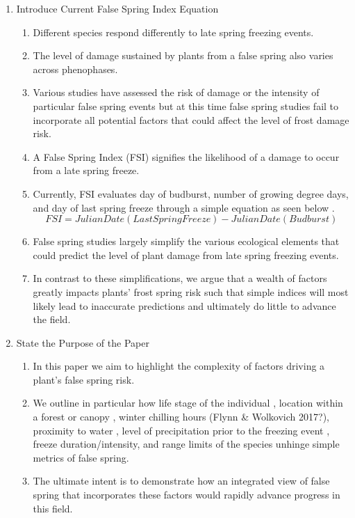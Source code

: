 \documentclass{article}\usepackage[]{graphicx}\usepackage[]{color}
\begin{document}
\begin{enumerate}
\item Introduce Current False Spring Index Equation
\begin{enumerate}
\item Different species respond differently to late spring freezing events. 
\item The level of damage sustained by plants from a false spring also varies across phenophases. 
\item Various studies have assessed the risk of damage or the intensity of particular false spring events but at this time false spring studies fail to incorporate all potential factors that could affect the level of frost damage risk. 
\item A False Spring Index (FSI) signifies the likelihood of a damage to occur from a late spring freeze. 
\item Currently, FSI evaluates day of budburst, number of growing degree days, and day of last spring freeze through a simple equation as seen below \citep{Marino2011}. 
\begin{equation} \label{eq:1}
FSI = Julian Date (Last Spring Freeze) - Julian Date (Budburst)
\end{equation}
\item False spring studies largely simplify the various ecological elements that could predict the level of plant damage from late spring freezing events. 
\item In contrast to these simplifications, we argue that a wealth of factors greatly impacts plants' frost spring risk such that simple indices will most likely lead to inaccurate predictions and ultimately do little to advance the field. 
\end{enumerate}

\item State the Purpose of the Paper
\begin{enumerate}
\item In this paper we aim to highlight the complexity of factors driving a plant's false spring risk. 
\item We outline in particular how life stage of the individual \citep{Caffarra2011}, location within a forest or canopy \citep{Augspurger2013}, winter chilling hours (Flynn \& Wolkovich 2017?), proximity to water \citep{Gu2008}, level of precipitation prior to the freezing event \citep{Anderegg2013}, freeze duration/intensity, and range limits of the species \citep{Martin2010} unhinge simple metrics of false spring. 
\item The ultimate intent is to demonstrate how an integrated view of false spring that incorporates these factors would rapidly advance progress in this field.  
\end{enumerate}
\end{enumerate}
\end{document}
